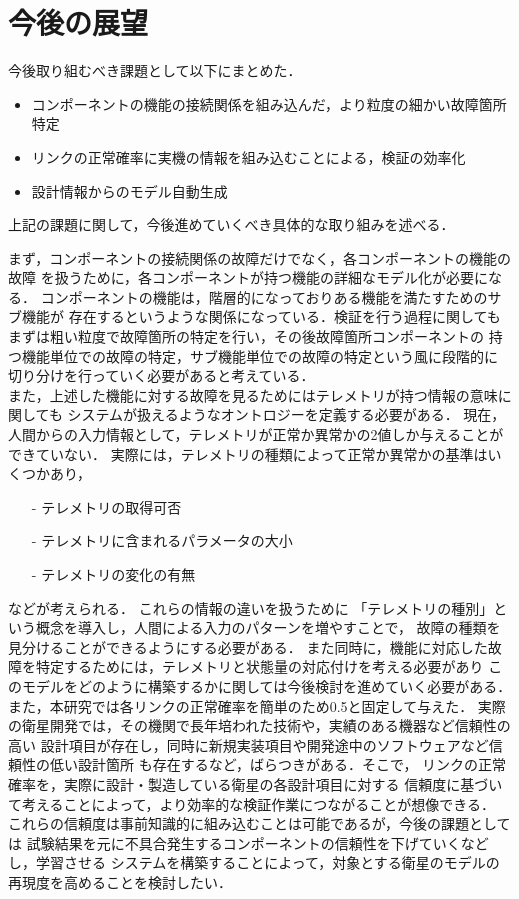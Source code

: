 \documentclass[11pt]{jsreport}
\begin{document}
  \section{今後の展望}
  今後取り組むべき課題として以下にまとめた．
\begin{itemize}
  \item コンポーネントの機能の接続関係を組み込んだ，より粒度の細かい故障箇所特定
  \item リンクの正常確率に実機の情報を組み込むことによる，検証の効率化
  \item 設計情報からのモデル自動生成
\end{itemize}
上記の課題に関して，今後進めていくべき具体的な取り組みを述べる．

まず，コンポーネントの接続関係の故障だけでなく，各コンポーネントの機能の故障
を扱うために，各コンポーネントが持つ機能の詳細なモデル化が必要になる．
コンポーネントの機能は，階層的になっておりある機能を満たすためのサブ機能が
存在するというような関係になっている．検証を行う過程に関しても
まずは粗い粒度で故障箇所の特定を行い，その後故障箇所コンポーネントの
持つ機能単位での故障の特定，サブ機能単位での故障の特定という風に段階的に
切り分けを行っていく必要があると考えている．\\
また，上述した機能に対する故障を見るためにはテレメトリが持つ情報の意味に関しても
システムが扱えるようなオントロジーを定義する必要がある．
現在，人間からの入力情報として，テレメトリが正常か異常かの2値しか与えることができていない．
実際には，テレメトリの種類によって正常か異常かの基準はいくつかあり，
\begin{itemize}
  \item[-] テレメトリの取得可否
  \item[-] テレメトリに含まれるパラメータの大小
  \item[-] テレメトリの変化の有無
\end{itemize}
などが考えられる．
これらの情報の違いを扱うために
「テレメトリの種別」という概念を導入し，人間による入力のパターンを増やすことで，
故障の種類を見分けることができるようにする必要がある．
また同時に，機能に対応した故障を特定するためには，テレメトリと状態量の対応付けを考える必要があり
このモデルをどのように構築するかに関しては今後検討を進めていく必要がある．\\

 また，本研究では各リンクの正常確率を簡単のため0.5と固定して与えた．
 実際の衛星開発では，その機関で長年培われた技術や，実績のある機器など信頼性の高い
 設計項目が存在し，同時に新規実装項目や開発途中のソフトウェアなど信頼性の低い設計箇所
 も存在するなど，ばらつきがある．そこで，
 リンクの正常確率を，実際に設計・製造している衛星の各設計項目に対する
 信頼度に基づいて考えることによって，より効率的な検証作業につながることが想像できる．
これらの信頼度は事前知識的に組み込むことは可能であるが，今後の課題としては
試験結果を元に不具合発生するコンポーネントの信頼性を下げていくなどし，学習させる
システムを構築することによって，対象とする衛星のモデルの再現度を高めることを検討したい．\\
\end{document}
